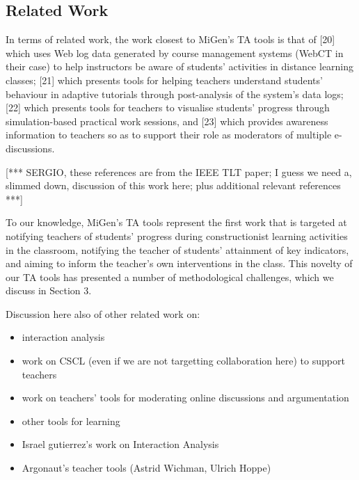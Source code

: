 
\subsection{Related Work}
\label{sec:related}

In terms of related work, the work closest to MiGen’s TA tools is that
of [20] which uses Web log data generated by course management systems
(WebCT in their case) to help instructors be aware of students’
activities in distance learning classes; [21] which presents tools for
helping teachers understand students’ behaviour in adaptive tutorials
through post-analysis of the system’s data logs; [22] which presents
tools for teachers to visualise students’ progress through
simulation-based practical work sessions, and [23] which provides
awareness information to teachers so as to support their role as
moderators of multiple e-discussions.  

[*** SERGIO, these references are from the IEEE TLT paper; I guess we
need a, slimmed down, discussion of this work here; plus additional
relevant references ***] 
 
To our knowledge, MiGen’s TA tools represent the first work that is
targeted at notifying teachers of students’ progress during
constructionist learning activities in the classroom, notifying the
teacher of students’ attainment of key indicators, and aiming to
inform the teacher’s own interventions in the class. This novelty of
our TA tools has presented a number of methodological challenges,
which we discuss in Section 3.  

Discussion here also of other related work on: 
\begin{itemize}
\item  interaction analysis
\item  work on CSCL (even if we are not targetting collaboration here)
  to support teachers 
\item  work on teachers’ tools for moderating online discussions and
  argumentation 
\item  other tools for learning
\item Israel gutierrez's work on Interaction Analysis
\item Argonaut's teacher tools (Astrid Wichman, Ulrich Hoppe)
\end{itemize}


